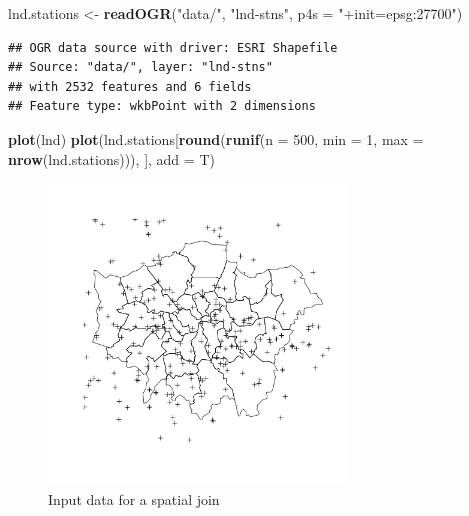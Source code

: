 \documentclass[]{article}
\newenvironment{Shaded}{}{}
\newcommand{\KeywordTok}[1]{\textcolor[rgb]{0.00,0.44,0.13}{\textbf{{#1}}}}
\newcommand{\DataTypeTok}[1]{\textcolor[rgb]{0.56,0.13,0.00}{{#1}}}
\newcommand{\DecValTok}[1]{\textcolor[rgb]{0.25,0.63,0.44}{{#1}}}
\newcommand{\StringTok}[1]{\textcolor[rgb]{0.25,0.44,0.63}{{#1}}}
\newcommand{\NormalTok}[1]{{#1}}
\let\Oldincludegraphics\includegraphics
\renewcommand{\includegraphics}[1]{\Oldincludegraphics[width=8cm]{#1}}
\begin{document}
\begin{Shaded}
\begin{Highlighting}[]
\NormalTok{lnd.stations <- }\KeywordTok{readOGR}\NormalTok{(}\StringTok{"data/"}\NormalTok{, }\StringTok{"lnd-stns"}\NormalTok{, }\DataTypeTok{p4s =} \StringTok{"+init=epsg:27700"}\NormalTok{)}
\end{Highlighting}
\end{Shaded}
\begin{verbatim}
## OGR data source with driver: ESRI Shapefile 
## Source: "data/", layer: "lnd-stns"
## with 2532 features and 6 fields
## Feature type: wkbPoint with 2 dimensions
\end{verbatim}
\begin{Shaded}
\begin{Highlighting}[]
\KeywordTok{plot}\NormalTok{(lnd)}
\KeywordTok{plot}\NormalTok{(lnd.stations[}\KeywordTok{round}\NormalTok{(}\KeywordTok{runif}\NormalTok{(}\DataTypeTok{n =} \DecValTok{500}\NormalTok{, }\DataTypeTok{min =} \DecValTok{1}\NormalTok{, }\DataTypeTok{max =} \KeywordTok{nrow}\NormalTok{(lnd.stations))), }
    \NormalTok{], }\DataTypeTok{add =} \NormalTok{T)}
\end{Highlighting}
\end{Shaded}
\begin{figure}[htbp]
\centering
\includegraphics{figure/Input_data_for_a_spatial_join.png}
\caption{Input data for a spatial join}
\end{figure}
\end{document}
